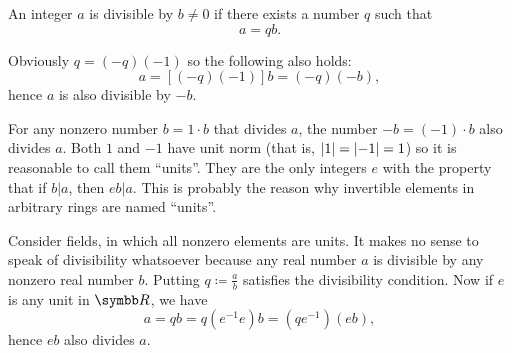 \begin{remark}\label{remark:units_in_rings_etymology}
  An integer \( a \) is divisible by \( b \neq 0 \) if there exists a number \( q \) such that
  \begin{equation*}
    a = qb.
  \end{equation*}

  Obviously \( q = (-q)(-1) \) so the following also holds:
  \begin{equation*}
    a = [(-q)(-1)]b = (-q)(-b),
  \end{equation*}
  hence \( a \) is also divisible by \( -b \).

  For any nonzero number \( b = 1 \cdot b \) that divides \( a \), the number \( -b = (-1) \cdot b \) also divides \( a \). Both \( 1 \) and \( -1 \) have unit norm (that is, \( \left\vert 1 \right\vert = \left\vert -1 \right\vert = 1 \)) so it is reasonable to call them \enquote{units}. They are the only integers \( e \) with the property that if \( b | a \), then \( eb | a \). This is probably the reason why invertible elements in arbitrary rings are named \enquote{units}.

  Consider fields, in which all nonzero elements are units. It makes no sense to speak of divisibility whatsoever because any real number \( a \) is divisible by any nonzero real number \( b \). Putting \( q \coloneqq \frac a b \) satisfies the divisibility condition. Now if \( e \) is any unit in \( \R \), we have
  \begin{equation*}
    a = qb = q(e^{-1} e) b = (qe^{-1}) (eb),
  \end{equation*}
  hence \( eb \) also divides \( a \).
\end{remark}


